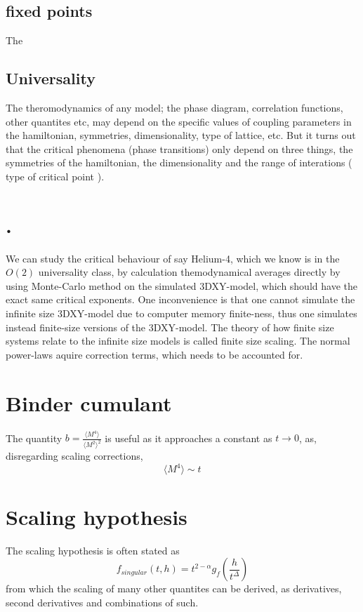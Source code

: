 \subsection{fixed points}
The 

\subsection{Universality}
The theromodynamics of any model; the phase diagram, correlation functions, other quantites etc, may depend on the specific values of coupling parameters in the hamiltonian, symmetries, dimensionality, type of lattice, etc. 
But it turns out that the critical phenomena (phase transitions) only depend on three things, the symmetries of the hamiltonian, the dimensionality and the range of interations ( type of critical point ).

\section{.}
We can study the critical behaviour of say Helium-4, which we know is in the $O(2)$ universality class, by calculation themodynamical averages directly by using Monte-Carlo method on the simulated 3DXY-model, which should have the exact same critical exponents. 
One inconvenience is that one cannot simulate the infinite size 3DXY-model due to computer memory finite-ness, thus one simulates instead finite-size versions of the 3DXY-model. The theory of how finite size systems relate to the infinite size models is called finite size scaling. The normal power-laws aquire correction terms, which needs to be accounted for.

\section{Binder cumulant}
The quantity $b =\frac{\langle M^4 \rangle}{\langle M^2\rangle^2}$ is useful as it approaches a constant as $t\rightarrow 0 $, as,  disregarding scaling corrections,
\begin{equation}
  \langle M^4 \rangle \sim t^{}
\end{equation}
\section{Scaling hypothesis}
The scaling hypothesis is often stated as
\begin{equation}
  f_{singular}(t,h) = t^{2- \alpha} g_f\left(\frac{h}{t^\Delta}\right)
\end{equation}
from which the scaling of many other quantites can be derived, as derivatives, second derivatives and combinations of such.

